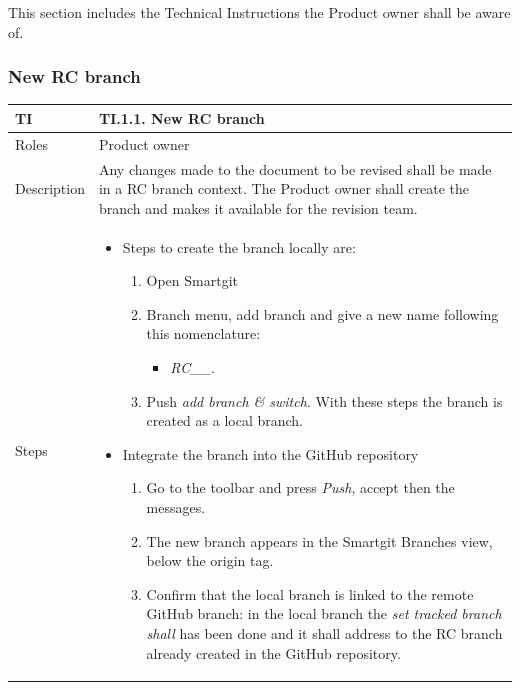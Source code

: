 \documentclass{template/openetcs_article}
\begin{document}
This section includes the Technical Instructions the Product owner shall be aware of.

\subsubsection{New RC branch}

\begin{flushleft}
\tablefirsthead{}
\tablehead{}
\tabletail{}
\tablelasttail{}
\begin{supertabular}{|m{2cm}|m{13cm}|}
\hline
{}
TI & 
TI.1.1. New RC branch
\\\hline
Roles &
Product owner
\\\hline
Description &
Any changes made to the document to be revised shall be made in a RC branch context. The Product owner shall create the branch and makes it available for the revision team.
\\\hline
Steps &
\begin{itemize}
\item Steps to create the branch locally are:
\begin{enumerate}
   \item Open Smartgit
   \item Branch menu, add branch and give a new name following this nomenclature: 
   \begin{itemize}
   \item {\it RC\_<name of the document to be revised>\_<number of Revision>}. 
   \end{itemize}
   \item Push {\it add branch \& switch}. With these steps the branch is created as a local branch.
\end{enumerate}
\item Integrate the branch into the GitHub repository
\begin{enumerate}
	\item Go to the toolbar and press {\it Push}, accept then the messages. 
	\item The new branch appears in the Smartgit Branches view, below the origin tag. 
	\item Confirm that the local branch is linked to the remote GitHub branch: in the local branch the {\it set tracked branch shall} has been done and it shall address to the RC branch already created in the GitHub repository.
\end{enumerate}
\end{itemize}
\\\hline
\end{supertabular}
\end{flushleft}
\end{document}
